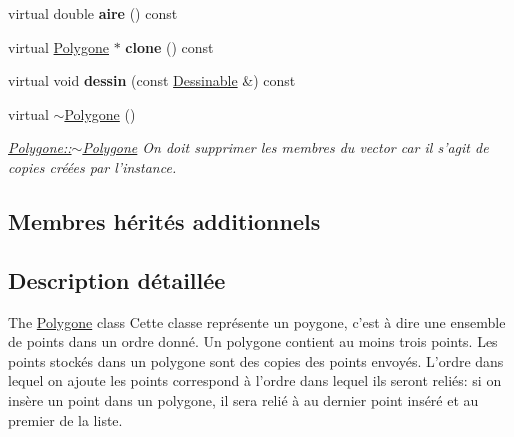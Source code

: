 \begin{DoxyCompactItemize}
\item 
\hypertarget{class_polygone_a933d95c281ba00ce39baf52fe3063b5e}{virtual double {\bfseries aire} () const }\label{class_polygone_a933d95c281ba00ce39baf52fe3063b5e}

\item 
\hypertarget{class_polygone_af9ae1d761d5a7f6834e46138eddd925f}{virtual \hyperlink{class_polygone}{Polygone} $\ast$ {\bfseries clone} () const }\label{class_polygone_af9ae1d761d5a7f6834e46138eddd925f}

\item 
\hypertarget{class_polygone_a1715df4b7ffd9b1e983c082d5d61c1ab}{virtual void {\bfseries dessin} (const \hyperlink{class_dessinable}{Dessinable} \&) const }\label{class_polygone_a1715df4b7ffd9b1e983c082d5d61c1ab}

\item 
\hypertarget{class_polygone_ae293043ea9d180259771515a6496cd8c}{virtual \hyperlink{class_polygone_ae293043ea9d180259771515a6496cd8c}{$\sim$\+Polygone} ()}\label{class_polygone_ae293043ea9d180259771515a6496cd8c}

\begin{DoxyCompactList}\small\item\em \hyperlink{class_polygone_ae293043ea9d180259771515a6496cd8c}{Polygone\+::$\sim$\+Polygone} On doit supprimer les membres du vector car il s'agit de copies créées par l'instance. \end{DoxyCompactList}\end{DoxyCompactItemize}
\subsection*{Membres hérités additionnels}


\subsection{Description détaillée}
The \hyperlink{class_polygone}{Polygone} class Cette classe représente un poygone, c'est à dire une ensemble de points dans un ordre donné. Un polygone contient au moins trois points. Les points stockés dans un polygone sont des copies des points envoyés. L'ordre dans lequel on ajoute les points correspond à l'ordre dans lequel ils seront reliés\+: si on insère un point dans un polygone, il sera relié à au dernier point inséré et au premier de la liste. 


